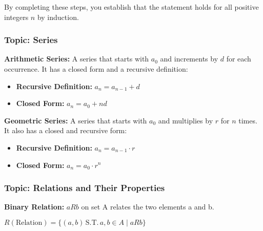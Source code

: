 \documentclass{article}
\begin{document}
\begin{flushleft}
By completing these steps, you establish that the statement holds for all positive integers \(n\) by induction.
\end{flushleft}
\subsubsection{Topic: Series}
\begin{flushleft}
\textbf{Arithmetic Series:} A series that starts with $a_0$ and increments by $d$ for each occurrence. It has a closed form and a recursive definition:
\end{flushleft}
\begin{itemize}
  \item \textbf{Recursive Definition:} \(a_n = a_{n-1} + d\)
  \item \textbf{Closed Form:} \(a_n = a_0 + nd\)
\end{itemize}
\begin{flushleft}
\textbf{Geometric Series:} A series that starts with $a_0$ and multiplies by $r$ for $n$ times. It also has a closed and recursive form:
\end{flushleft}
\begin{itemize}
  \item \textbf{Recursive Definition:} \(a_n = a_{n-1} \cdot r\)
  \item \textbf{Closed Form:} \(a_n = a_0 \cdot r^n\)
\end{itemize}
\begin{flushleft}
\subsubsection{Topic: Relations and Their Properties}
\textbf{Binary Relation:} $aRb$ on set A relates the two elements a and b.
\end{flushleft}
$R(\text{Relation}) = \{(a, b) \, \text{S.T.} \, a, b \in A \mid aRb\}$
\end{document}
